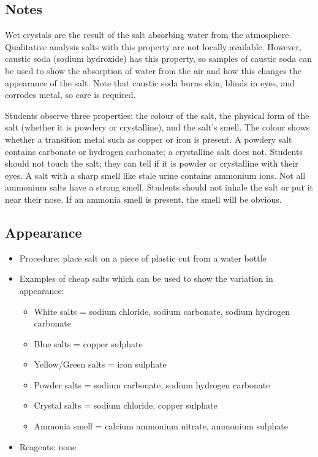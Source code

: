 \subsection{Notes}

Wet crystals are the result of the salt absorbing water from the atmosphere. Qualitative analysis salts with this property are not locally available. However, caustic soda (sodium hydroxide) has this property, so samples of caustic soda can be used to show the absorption of water from the air and how this changes the appearance of the salt. Note that caustic soda burns skin, blinds in eyes, and corrodes metal, so care is required.

Students observe three properties: the colour of the salt, 
the physical form of the salt (whether it is powdery or crystalline), 
and the salt's smell. 
The colour shows whether a transition metal such as copper 
or iron is present. 
A powdery salt contains carbonate or hydrogen carbonate; 
a crystalline salt does not. 
Students should not touch the salt; 
they can tell if it is powder or crystalline with their eyes. 
A salt with a sharp smell like stale urine contains ammonium ions. 
Not all ammonium salts have a strong smell. 
Students should not inhale the salt or put it near their nose. 
If an ammonia smell is present, 
the smell will be obvious.

\subsection{Appearance}
\begin{itemize}
\item{Procedure: place salt on a piece of plastic cut from a water bottle}
\item{Examples of cheap salts which can be used to show the variation in appearance:}
\begin{itemize}
\item{White salts = sodium chloride, 
sodium carbonate, 
sodium hydrogen carbonate}
\item{Blue salts = copper sulphate}
\item{Yellow/Green salts = iron sulphate}
\item{Powder salts = sodium carbonate, 
sodium hydrogen carbonate}
\item{Crystal salts = sodium chloride, 
copper sulphate}
\item{Ammonia smell = calcium ammonium nitrate, ammonium sulphate}
\end{itemize}
\item{Reagents: none}
\end{itemize}

